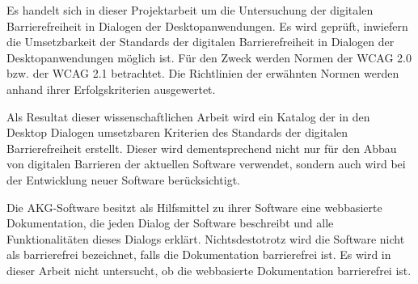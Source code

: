 
Es handelt sich in dieser Projektarbeit um die Untersuchung der digitalen Barrierefreiheit in Dialogen der Desktopanwendungen. Es wird geprüft, inwiefern die Umsetzbarkeit der Standards der digitalen Barrierefreiheit in Dialogen der Desktopanwendungen möglich ist. Für den Zweck werden Normen der \ac{WCAG} 2.0 bzw. der \ac{WCAG} 2.1 betrachtet. Die Richtlinien der erwähnten Normen werden anhand ihrer Erfolgskriterien ausgewertet.

Als Resultat dieser wissenschaftlichen Arbeit wird ein Katalog der in den Desktop Dialogen umsetzbaren Kriterien des Standards der digitalen Barrierefreiheit erstellt. Dieser wird dementsprechend nicht nur für den Abbau von digitalen Barrieren der aktuellen Software verwendet, sondern auch wird bei der Entwicklung neuer Software berücksichtigt.

Die AKG-Software besitzt als Hilfsmittel zu ihrer Software eine webbasierte Dokumentation, die jeden Dialog der Software beschreibt und alle Funktionalitäten dieses Dialogs erklärt. Nichtsdestotrotz wird die Software nicht als barrierefrei bezeichnet, falls die Dokumentation barrierefrei ist. Es wird in dieser Arbeit nicht untersucht, ob die webbasierte Dokumentation barrierefrei ist.
